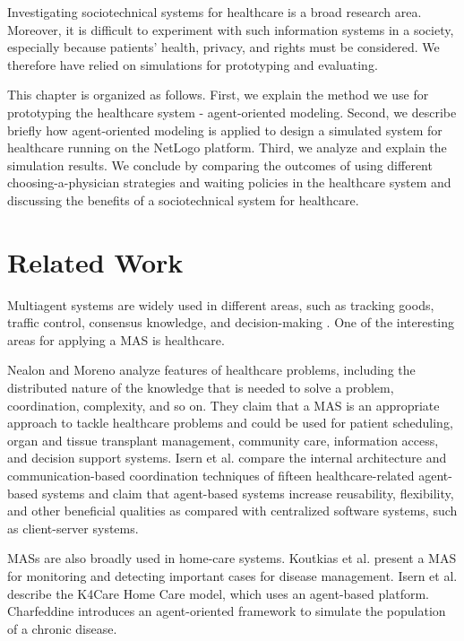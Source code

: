 Investigating sociotechnical systems for healthcare is a broad research area. Moreover, it is difficult to experiment with such information systems in a society, especially because patients' health, privacy, and rights must be considered. We therefore have relied on simulations for prototyping and evaluating.

This chapter is organized as follows. First, we explain the method we use for prototyping the healthcare system - agent-oriented modeling. Second, we describe briefly how agent-oriented modeling is applied to design a simulated system for healthcare running on the NetLogo platform. Third, we analyze and explain the simulation results. We conclude by comparing the outcomes of using different choosing-a-physician strategies and waiting policies in the healthcare system and discussing the benefits of a sociotechnical system for healthcare.

\section{Related Work}
\label{ch3:relatedwork}
Multiagent systems are widely used in different areas, such as tracking goods, traffic control, consensus knowledge, and decision-making \cite{huhns2009}. One of the interesting areas for applying a MAS is healthcare.

Nealon and Moreno \cite{nealon2003} analyze features of healthcare problems, including the distributed nature of the knowledge that is needed to solve a problem, coordination, complexity, and so on. They claim that a MAS is an appropriate approach to tackle healthcare problems and could be used for patient scheduling, organ and tissue transplant management, community care, information access, and decision support systems. Isern et al. \cite{isern2010} compare the internal architecture and communication-based coordination techniques of fifteen healthcare-related agent-based systems and claim that agent-based systems increase reusability, flexibility, and other beneficial qualities as compared with centralized software systems, such as client-server systems.

MASs are also broadly used in home-care systems. Koutkias et al. \cite{koutkias2005} present a MAS for monitoring and detecting important cases for disease management. Isern et al. \cite{isern2008} describe the K4Care Home Care model, which uses an agent-based platform. Charfeddine \cite{charfeddine2010} introduces an agent-oriented framework to simulate the population of a chronic disease.

